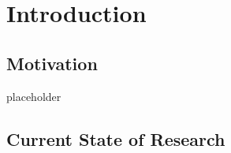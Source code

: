 \section{Introduction}
	\subsection{Motivation}
		{\color{red} \Large placeholder}
		
	\subsection{Current State of Research}
		
	